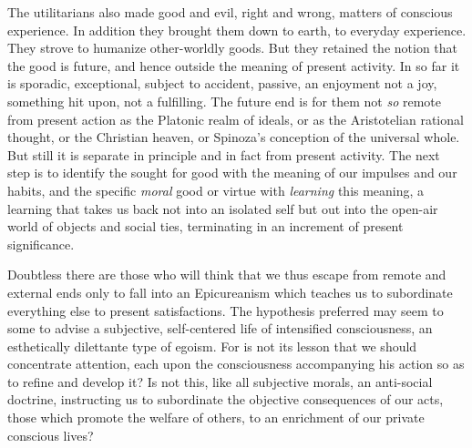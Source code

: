\documentclass[12pt]{article}
\begin{document}
The utilitarians also made good and evil, right and
wrong, matters of conscious experience. In addition
they brought them down to earth, to everyday experience.
They strove to humanize other-worldly goods.
But they retained the notion that the good is future,
and hence outside the meaning of present activity. In
so far it is sporadic, exceptional, subject to accident,
passive, an enjoyment not a joy, something hit upon,
not a fulfilling. The future end is for them not \emph{so}
remote from present action as the Platonic realm of
ideals, or as the Aristotelian rational thought, or the
Christian heaven, or Spinoza's conception of the universal
whole. But still it is separate in principle and
in fact from present activity. The next step is to identify
the sought for good with the meaning of our
impulses and our habits, and the specific \emph{moral} good
or virtue with \emph{learning} this meaning, a learning that
takes us back not into an isolated self but out into the
open-air world of objects and social ties, terminating
in an increment of present significance.

Doubtless there are those who will think that we
thus escape from remote and external ends only to fall
into an Epicureanism which teaches us to subordinate
everything else to present satisfactions. The hypothesis
preferred may seem to some to advise a subjective,
self-centered life of intensified consciousness, an esthetically
dilettante type of egoism. For is not its lesson
that we should concentrate attention, each upon the
consciousness accompanying his action so as to refine
and develop it? Is not this, like all subjective morals,
an anti-social doctrine, instructing us to subordinate
the objective consequences of our acts, those which promote
the welfare of others, to an enrichment of our
private conscious lives?
\end{document}
